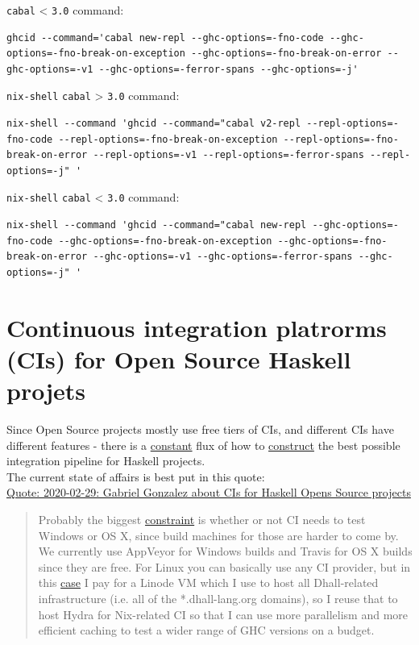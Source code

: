 \documentclass[a4paper,14pt,oneside]{book}
\begin{document}
{\texttt{cabal} < \texttt{3.0} command:\\
\begin{verbatim}
ghcid --command='cabal new-repl --ghc-options=-fno-code --ghc-options=-fno-break-on-exception --ghc-options=-fno-break-on-error --ghc-options=-v1 --ghc-options=-ferror-spans --ghc-options=-j'
\end{verbatim}

\texttt{nix-shell} \texttt{cabal} > \texttt{3.0} command:\\
\begin{verbatim}
nix-shell --command 'ghcid --command="cabal v2-repl --repl-options=-fno-code --repl-options=-fno-break-on-exception --repl-options=-fno-break-on-error --repl-options=-v1 --repl-options=-ferror-spans --repl-options=-j" '
\end{verbatim}

\texttt{nix-shell} \texttt{cabal} < \texttt{3.0} command:\\
\begin{verbatim}
nix-shell --command 'ghcid --command="cabal new-repl --ghc-options=-fno-code --ghc-options=-fno-break-on-exception --ghc-options=-fno-break-on-error --ghc-options=-v1 --ghc-options=-ferror-spans --ghc-options=-j" '

\end{verbatim}

\chapter{Continuous integration platrorms (CIs) for Open Source Haskell projets}
\label{sec:orgc49bbe1}

Since Open Source projects mostly use free tiers of CIs, and different CIs have different features - there is a \hyperref[org2b10b3e]{constant} flux of how to \hyperref[orgadd667a]{construct} the best possible integration pipeline for Haskell projects.\\

The current state of affairs is best put in this quote:\\
\caption{\href{https://github.com/dhall-lang/dhall-haskell/issues/1678#issuecomment-592960057}{Quote: 2020-02-29: Gabriel Gonzalez about CIs for Haskell Opens Source projects}}
\label{quote--gonzales-ci}
\begin{quote}
Probably the biggest \hyperref[org5637118]{constraint} is whether or not CI needs to test Windows or OS X, since build machines for those are harder to come by. We currently use AppVeyor for Windows builds and Travis for OS X builds since they are free. For Linux you can basically use any CI provider, but in this \hyperref[org6609611]{case} I pay for a Linode VM which I use to host all Dhall-related infrastructure (i.e. all of the *.dhall-lang.org domains), so I reuse that to host Hydra for Nix-related CI so that I can use more parallelism and more efficient caching to test a wider range of GHC versions on a budget.\\


\end{quote}}
\end{document}
